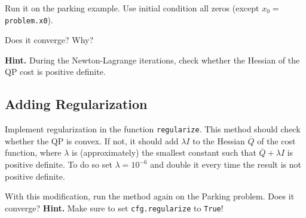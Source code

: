 \documentclass[]{article}
\begin{document}
\begin{assignment}
   Run it on the parking example. Use initial condition all zeros (except $x_0 = $\texttt{problem.x0}).
   
	Does it converge? Why? 
	
	\textbf{Hint. } During the Newton-Lagrange iterations, check whether the Hessian of the QP cost is positive definite.
\end{assignment}



\subsection{Adding Regularization}

\begin{assignment}
	Implement regularization in the function \texttt{regularize}. This method should 
	check whether the QP is convex. 
	If not, it should add $\lambda I$ to the Hessian $\overline{Q}$ of the cost function, where $\lambda$ is 
	(approximately) the smallest constant such that $\overline{Q} + \lambda I$ is positive definite.
	To do so set $\lambda = 10^{-6}$ and double it every time the result is not positive definite. 
	
	With this modification, run the method again on the Parking problem. Does it converge? 
	\textbf{Hint.}  Make sure to set \texttt{cfg.regularize} to \texttt{True}!
\end{assignment}


 
\end{document}
